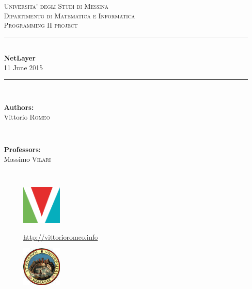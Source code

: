 \documentclass[12pt]{report}
\newcommand{\HRule}{\rule{\linewidth}{0.5mm}}
\renewcommand\emph{\textbf}
\begin{document}
\begin{titlepage}

    \center

    \textsc{\LARGE Universita' degli Studi di Messina}\\[0.1cm]
    \textsc{\Large Dipartimento di Matematica e Informatica}\\[0.5cm]
    \textsc{\Large Programming II project}\\[0.5cm]

    \HRule \\[0.4cm]
    { \huge \bfseries NetLayer}\\[0.1cm]

    {\large 11 June 2015}
    \HRule \\[1.5cm]

    \begin{minipage}{0.4\textwidth}
    \begin{flushleft} \large
    \emph{Authors:}\\
    Vittorio \textsc{Romeo}
    \end{flushleft}
    \end{minipage}
    ~
    \begin{minipage}{0.4\textwidth}
    \begin{flushright} \large
    \emph{Professors:} \\
    Massimo \textsc{Vilari}


    \end{flushright}
    \end{minipage}\\[4cm]

    \vfill


    \begin{minipage}{\linewidth}
        \centering
        \begin{minipage}{0.35\linewidth}
            \begin{figure}[H]
                \center
                \includegraphics[width=2cm, height=2cm]{logovee}

                \url{http://vittorioromeo.info}
            \end{figure}
        \end{minipage}
        \hspace{0.27\linewidth}
        \begin{minipage}{0.35\linewidth}
            \begin{figure}[H]
                \center
                \includegraphics[width=2cm, height=2cm]{logounime}


\end{figure}
\end{minipage}
\end{minipage}
\end{titlepage}
\end{document}
